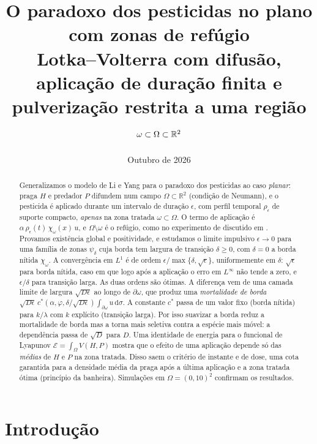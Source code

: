 \documentclass[11pt,a4paper]{article}
\title{O paradoxo dos pesticidas no plano com zonas de refúgio\\[4pt]
\large Lotka--Volterra com difusão, aplicação de duração finita e pulverização
restrita a uma região $\omega\subset\Omega\subset\R^2$}
\author{}
\date{Outubro de 2026}
\numberwithin{equation}{section}
\theoremstyle{definition}
\theoremstyle{remark}
\newcommand{\R}{\mathbb{R}}
\newcommand{\E}{\mathcal{E}}
\newcommand{\dd}{\,\mathrm{d}}
\begin{document}
\maketitle

\begin{abstract}
Generalizamos o modelo de Li e Yang \cite{LiYang} para o paradoxo dos pesticidas ao caso
\emph{planar}: praga $H$ e predador $P$ difundem num campo $\Omega\subset\R^2$ (condição de
Neumann), e o pesticida é aplicado durante um intervalo de duração $\epsilon$, com perfil
temporal $\rho_\epsilon$ de suporte compacto, \emph{apenas} na zona tratada $\omega\subset\Omega$.
O termo de aplicação é $\alpha\,\rho_\epsilon(t)\,\chi_\omega(x)\,u$, e $\Omega\setminus\omega$ é
o refúgio, como no experimento de \cite{Lester} discutido em \cite{LiYang}. Provamos existência
global e positividade, e estudamos o limite impulsivo $\epsilon\to0$ para uma família de zonas
$\psi_\delta$ cuja borda tem largura de transição $\delta\ge0$, com $\delta=0$ a borda nítida
$\chi_\omega$. A convergência em $L^1$ é de ordem $\epsilon/\max\{\delta,\sqrt\epsilon\}$, uniformemente
em $\delta$: $\sqrt\epsilon$ para borda nítida, caso em que logo após a aplicação o erro em $L^\infty$
não tende a zero, e $\epsilon/\delta$ para transição larga. As duas ordens são ótimas. A diferença vem
de uma camada limite de largura $\sqrt{D\epsilon}$ ao longo de $\partial\omega$, que produz uma
\emph{mortalidade de borda} $\sqrt{D\epsilon}\,c^*(\alpha,\varphi,\delta/\sqrt{D\epsilon})\int_{\partial\omega}u\dd\sigma$.
A constante $c^*$ passa de um valor fixo (borda nítida) para $k/\lambda$ com $k$ explícito (transição
larga). Por isso suavizar a borda reduz a mortalidade de borda mas a torna mais seletiva contra a
espécie mais móvel: a dependência passa de $\sqrt D$ para $D$.
Uma identidade de energia para o funcional de Lyapunov $\E=\int_\Omega V(H,P)$ mostra que o
efeito de uma aplicação depende só das \emph{médias} de $H$ e $P$ na zona tratada. Disso saem
o critério de instante e de dose, uma cota garantida para a densidade média da praga após a
última aplicação e a zona tratada ótima (princípio da banheira). Simulações em $\Omega=(0,10)^2$
confirmam os resultados.
\end{abstract}

\tableofcontents

\section{Introdução}
\end{document}
